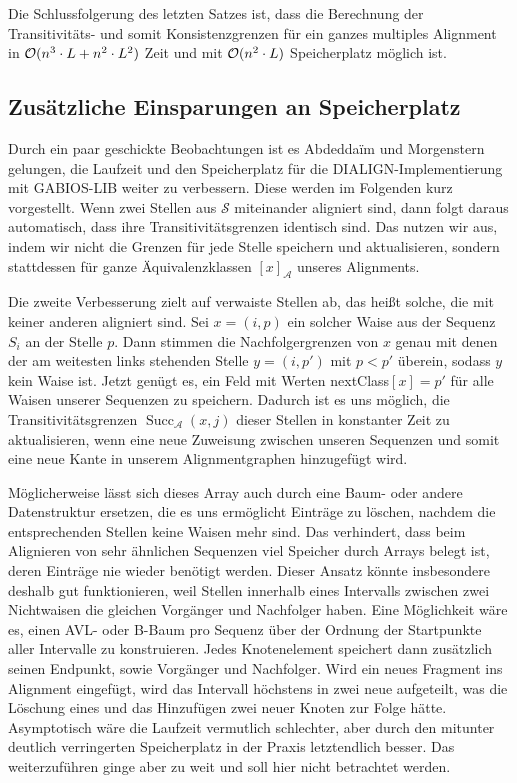 Die Schlussfolgerung des letzten Satzes ist, dass die Berechnung der Transitivitäts- und somit Konsistenzgrenzen für ein ganzes multiples Alignment in $\mathcal{O}(n^3\cdot L + n^2\cdot L^2)$ Zeit und mit $\mathcal{O}(n^2\cdot L)$ Speicherplatz möglich ist. 

\subsection{Zusätzliche Einsparungen an Speicherplatz}

Durch ein paar geschickte Beobachtungen ist es Abdedda\"im und Morgenstern gelungen, die Laufzeit und den Speicherplatz für die DIALIGN-Implementierung mit GABIOS-LIB weiter zu verbessern\cite{am00}. Diese werden im Folgenden kurz vorgestellt. Wenn zwei Stellen aus $\mathcal{S}$ miteinander aligniert sind, dann folgt daraus automatisch, dass ihre Transitivitätsgrenzen identisch sind. Das nutzen wir aus, indem wir nicht die Grenzen für jede Stelle speichern und aktualisieren, sondern stattdessen für ganze Äquivalenzklassen $[x]_{\mathcal{A}}$ unseres Alignments.

Die zweite Verbesserung zielt auf verwaiste Stellen ab, das heißt solche, die mit keiner anderen aligniert sind. Sei $x = (i,p)$ ein solcher Waise aus der Sequenz $S_i$ an der Stelle $p$. Dann stimmen die Nachfolgergrenzen von $x$ genau mit denen der am weitesten links stehenden Stelle $y = (i,p')$ mit $p < p'$ überein, sodass $y$ kein Waise ist.
Jetzt genügt es, ein Feld mit Werten \textrm{nextClass}$[x] = p'$ für alle Waisen unserer Sequenzen zu speichern. Dadurch ist es uns möglich, die Transitivitätsgrenzen $\operatorname{Succ}_{\mathcal{A}}(x,j)$ dieser Stellen in konstanter Zeit zu aktualisieren, wenn eine neue Zuweisung zwischen unseren Sequenzen und somit eine neue Kante in unserem Alignmentgraphen hinzugefügt wird. 

Möglicherweise lässt sich dieses Array auch durch eine Baum- oder andere Datenstruktur ersetzen, die es uns ermöglicht Einträge zu löschen, nachdem die entsprechenden Stellen keine Waisen mehr sind. Das verhindert, dass beim Alignieren von sehr ähnlichen Sequenzen viel Speicher durch Arrays belegt ist, deren Einträge nie wieder benötigt werden. Dieser Ansatz könnte insbesondere deshalb gut funktionieren, weil Stellen innerhalb eines Intervalls zwischen zwei Nichtwaisen die gleichen Vorgänger und Nachfolger haben. Eine Möglichkeit wäre es, einen AVL- oder B-Baum pro Sequenz über der Ordnung der Startpunkte aller Intervalle zu konstruieren. Jedes Knotenelement speichert dann zusätzlich seinen Endpunkt, sowie Vorgänger und Nachfolger. Wird ein neues Fragment ins Alignment eingefügt, wird das Intervall höchstens in zwei neue aufgeteilt, was die Löschung eines und das Hinzufügen zwei neuer Knoten zur Folge hätte. Asymptotisch wäre die Laufzeit vermutlich schlechter, aber durch den mitunter deutlich verringerten Speicherplatz in der Praxis letztendlich besser. Das weiterzuführen ginge aber zu weit und soll hier nicht betrachtet werden.

